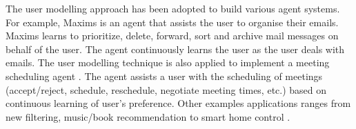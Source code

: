 The user modelling approach has been adopted to build various agent systems. For example, Maxims \cite{Metral1998} is an agent that assists the user to organise their emails. Maxims learns to prioritize, delete, forward, sort and archive mail messages on behalf of the user. The agent continuously learns the user as the user deals with emails. The user modelling technique is also applied to implement a meeting scheduling agent \cite{Kozierok1993}. The agent assists a user with the scheduling of meetings (accept/reject, schedule, reschedule, negotiate meeting times, etc.) based on continuous learning of user's preference. Other examples applications ranges from new filtering, music/book recommendation \cite{Lieberman2003} to smart home control \cite{Costanza2014}.




